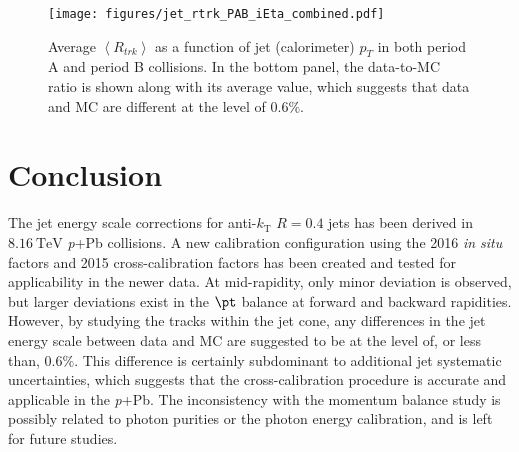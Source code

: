 \documentclass[NOTE, atlasdraft=true, texlive=2016, USenglish]{\ATLASLATEXPATH atlasdoc}
\begin{document}
\begin{figure}
	\centering
	\texttt{[image: figures/jet\_rtrk\_PAB\_iEta\_combined.pdf]}
	\caption{Average $\left<R_{trk}\right>$ as a function of jet (calorimeter) $p_{T}$ in both period A and period B collisions. In the bottom panel, the data-to-MC ratio is shown along with its average value, which suggests that data and MC are different at the level of $0.6\%$.}
	\label{fig:rtrk_summary}
\end{figure}

\section{Conclusion}
\label{sec:conclusion}

The jet energy scale corrections for anti-$k_{\text{T}}$ $R=0.4$ jets has been derived in $\SI{8.16}{\TeV}$ \textit{p}+Pb collisions. A new calibration configuration using the 2016 \textit{in situ} factors and 2015 cross-calibration factors has been created and tested for applicability in the newer data. At mid-rapidity, only minor deviation is observed, but larger deviations exist in the $\pt$ balance at forward and backward rapidities. However, by studying the tracks within the jet cone, any differences in the jet energy scale between data and MC are suggested to be at the level of, or less than, $0.6\%$. This difference is certainly subdominant to additional jet systematic uncertainties, which suggests that the cross-calibration procedure is accurate and applicable in the \textit{p}+{Pb}. The inconsistency with the momentum balance study is possibly related to photon purities or the photon energy calibration, and is left for future studies. 


\clearpage
\printbibliography
% 
% 

\end{document}
